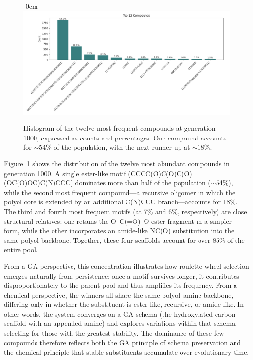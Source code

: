 \documentclass[life,article,submit,pdftex,moreauthors]{Definitions/mdpi}
\begin{document}
\begin{figure}[H]
\begin{adjustwidth}{-\extralength}{0cm}
\centering
\includegraphics[width=\fulllength]{SDA-chem-hist.png}
\end{adjustwidth}
\caption{Histogram of the twelve most frequent compounds at generation 1000, expressed as counts and percentages. One compound accounts for $\sim$54\% of the population, with the next runner-up at $\sim$18\%.}
\label{fig:chem-compound-hist}
\end{figure}

Figure~\ref{fig:chem-compound-hist} shows the distribution of the twelve most abundant compounds in generation 1000. A single ester-like motif (CCCC(O)C(O)C(O)(OC(O)OC)C(N)CCC) dominates more than half of the population ($\sim$54\%), while the second most frequent compound---a recursive oligomer in which the polyol core is extended by an additional C(N)CCC branch---accounts for 18\%. The third and fourth most frequent motifs (at 7\% and 6\%, respectively) are close structural relatives: one retains the O–C(=O)–O ester fragment in a simpler form, while the other incorporates an amide-like NC(O) substitution into the same polyol backbone. Together, these four scaffolds account for over 85\% of the entire pool.

From a GA perspective, this concentration illustrates how roulette-wheel selection emerges naturally from persistence: once a motif survives longer, it contributes disproportionately to the parent pool and thus amplifies its frequency. From a chemical perspective, the winners all share the same polyol–amine backbone, differing only in whether the substituent is ester-like, recursive, or amide-like. In other words, the system converges on a GA schema (the hydroxylated carbon scaffold with an appended amine) and explores variations within that schema, selecting for those with the greatest stability. The dominance of these few compounds therefore reflects both the GA principle of schema preservation and the chemical principle that stable substituents accumulate over evolutionary time.
\end{document}
